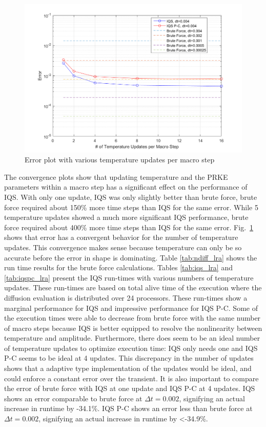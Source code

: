 \documentclass{anstrans}
\newcommand{\fig}[1]{Fig.~\ref{#1}}                      %
\begin{document}
\begin{figure}[htbp!]
\centering
\includegraphics[width=\linewidth]{lra_mp.png}
\caption{Error plot with various temperature updates per macro step}
\label{fig:mp}
\end{figure}

The convergence plots show that updating temperature and the PRKE parameters within a macro step has a significant effect on the performance of IQS.  With only one update, IQS was only slightly better than brute force, brute force required about 150\% more time steps than IQS for the same error.  While 5 temperature updates showed a much more significant IQS performance, brute force required about 400\% more time steps than IQS for the same error.  \fig{fig:mp} shows that error has a convergent behavior for the number of temperature updates.  This convergence makes sense because temperature can only be so accurate before the error in shape is dominating. Table \ref{tab:ndiff_lra} shows the run time results for the brute force calculations.  Tables \ref{tab:iqs_lra} and \ref{tab:iqspc_lra} present the IQS run-times with various numbers of temperature updates.  These run-times are based on total alive time of the execution where the diffusion evaluation is distributed over 24 processors. These run-times show a marginal performance for IQS and impressive performance for IQS P-C.  Some of the execution times were able to decrease from brute force with the same number of macro steps because IQS is better equipped to resolve the nonlinearity between temperature and amplitude. Furthermore, there does seem to be an ideal number of temperature updates to optimize execution time: IQS only needs one and IQS P-C seems to be ideal at 4 updates. This discrepancy in the number of updates shows that a adaptive type implementation of the updates would be ideal, and could enforce a constant error over the transient. It is also important to compare the error of brute force with IQS at one update and IQS P-C at 4 updates.  IQS shows an error comparable to brute force at $\Delta t = 0.002$, signifying an actual increase in runtime by -34.1\%.  IQS P-C shows an error less than brute force at $\Delta t = 0.002$, signifying an actual increase in runtime by <-34.9\%. \\
\end{document}

